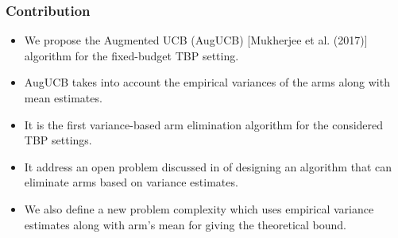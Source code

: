 \begin{frame}
\frametitle{Contribution}
\begin{itemize}
\item<1-> We propose the Augmented UCB (AugUCB) [{Mukherjee et al. (2017)}]  algorithm for the fixed-budget TBP setting.
\item<2-> AugUCB takes into account the empirical variances of the arms along with mean estimates.
\item<3-> It is the first variance-based arm elimination algorithm for the considered TBP settings. 
\item<4-> It address an open problem discussed in \cite{auer2010ucb} of designing an algorithm that can eliminate arms based on variance estimates.
\item<5-> We also define a new problem complexity which uses empirical variance estimates along with arm's mean for giving the theoretical bound.
\end{itemize}
\end{frame}


%


